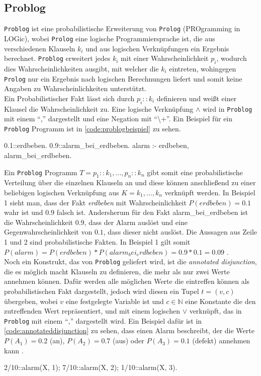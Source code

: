 \documentclass[german,version-2020-11]{uzl-thesis}
\begin{document}
\subsection{Problog}
\texttt{Problog} ist eine probabilistische Erweiterung von \texttt{Prolog} (PROgramming in LOGic), wobei \texttt{Prolog} eine logische Programmiersprache ist, die aus verschiedenen Klauseln $k_i$ und aus logischen Verknüpfungen ein Ergebnis berechnet. \texttt{Problog} erweitert jedes $k_i$ mit einer Wahrscheinlichkeit $p_i$, wodurch dies Wahrscheinlichkeiten ausgibt, mit welcher die $k_i$ eintreten, wohingegen \texttt{Prolog} nur ein Ergebnis nach logischen Berechnungen liefert und somit keine Angaben zu Wahrscheinlichkeiten unterstützt. \\  Ein Probabilistischer Fakt lässt sich durch $p_i :: k_i$ definieren und weißt einer Klausel die Wahrscheinlichkeit zu. Eine logische Verknüpfung $\land$ wird in \texttt{Problog} mit einem \enquote{,} dargestellt und eine Negation mit  \enquote{\textbackslash+}. Ein Beispiel für ein \texttt{Problog} Programm ist in \autoref{code:problogbeispiel} zu sehen.
\begin{Pseudocode}[caption={\texttt{Problog} Programm-Beispiel}, label={code:problogbeispiel}, numbers=left]
0.1::erdbeben.
0.9::alarm_bei_erdbeben.
alarm :- erdbeben, alarm_bei_erdbeben.
\end{Pseudocode} 
Ein \texttt{Problog} Programm $T = {p_1 :: k_1, \dots, p_n :: k_n}$ gibt somit eine probabilistische Verteilung über die einzelnen Klauseln an und diese können anschließend zu einer beliebigen logischen Verknüpfung aus $K = {k_1 , \dots , k_n}$ verknüpft werden. In Beispiel 1 sieht man, dass der Fakt \textit{erdbeben} mit Wahrscheinlichkeit $ P(erdbeben) = 0.1$ wahr ist und $0.9$ falsch ist. Andersherum für den Fakt alarm\_bei\_erdbeben ist die Wahrscheinlichkeit $0.9$, dass der Alarm auslöst und eine Gegenwahrscheinlichkeit von $0.1$, dass dieser nicht auslöst. Die Aussagen aus Zeile 1 und 2 sind probabilistische Fakten.  In Beispiel 1 gilt somit $P(alarm) = P(erdbeben) * P(alarm_bei_erdbeben) = 0.9 * 0.1 = 0.09$ \cite{4}\cite{5}. \\ 
Noch ein Konstrukt, das von \texttt{Problog} geliefert wird, ist die \textit{annotated disjunction}, die es möglich macht Klauseln zu definieren, die mehr als nur zwei Werte annehmen können. Dafür werden alle möglichen Werte die eintreffen können als probabilistischen Fakt dargestellt, jedoch wird diesen ein Tupel $t = (v,c) $ übergeben, wobei $v$ eine festgelegte Variable ist und $c \in \mathbb{N}$ eine Konstante die den zutreffenden Wert repräsentiert, und  mit einem logischen $\lor$ verknüpft, das in \texttt{Problog} mit einem \enquote{,} dargestellt wird. Ein Beispiel dafür ist in \autoref{code:annotateddisjunction} zu sehen, dass einen Alarm beschreibt, der die Werte $P(A_1) = 0.2$ (an), $P(A_2) = 0.7$ (aus) oder $P(A_3) = 0.1$ (defekt) annehmen kann \cite{5}.
\begin{Pseudocode}[caption={\texttt{Problog}-Beispiel \textit{annotated disjunction}}, label={code:annotateddisjunction}, numbers=left]
2/10::alarm(X, 1); 7/10::alarm(X, 2); 1/10::alarm(X, 3).
\end{Pseudocode}
\end{document}
